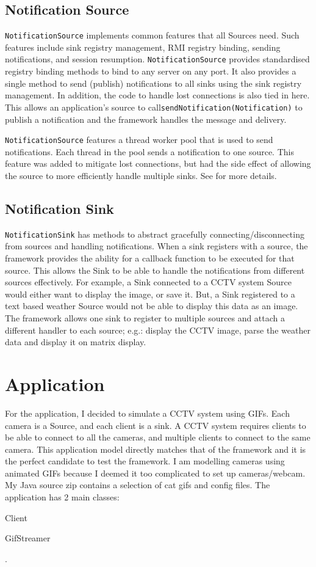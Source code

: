 \documentclass[a4paper]{article}
\begin{document}
\subsection{Notification Source}
\texttt{NotificationSource} implements common features that all Sources need.
Such features include sink registry management, RMI registry binding, sending notifications, and session resumption.
\texttt{NotificationSource} provides standardised registry binding methods to bind to any server on any port.
It also provides a single method to send (publish) notifications to all sinks using the sink registry management.
In addition, the code to handle lost connections is also tied in here.
This allows an application's source to call\texttt{sendNotification(Notification)} to publish a notification and the framework handles the message and delivery.

\texttt{NotificationSource} features a thread worker pool that is used to send notifications.
Each thread in the pool sends a notification to one source.
This feature was added to mitigate lost connections, but had the side effect of allowing the source to more efficiently handle multiple sinks.
See  for more details.

\subsection{Notification Sink}
\texttt{NotificationSink} has methods to abstract gracefully connecting/disconnecting from sources and handling notifications.
When a sink registers with a source, the framework provides the ability for a callback function to be executed for that source.
This allows the Sink to be able to handle the notifications from different sources effectively.
For example, a Sink connected to a CCTV system Source would either want to display the image, or save it.
But, a Sink registered to a text based weather Source would not be able to display this data as an image.
The framework allows one sink to register to multiple sources and attach a different handler to each source;
e.g.: display the CCTV image, parse the weather data and display it on matrix display.

\section{Application}
For the application, I decided to simulate a CCTV system using GIFs.
Each camera is a Source, and each client is a sink.
A CCTV system requires clients to be able to connect to all the cameras, and multiple clients to connect to the same camera.
This application model directly matches that of the framework and it is the perfect candidate to test the framework.
I am modelling cameras using animated GIFs because I deemed it too complicated to set up cameras/webcam.
My Java source zip contains a selection of cat gifs and config files. The application has 2 main classes:
\begin{enumerate*}
  \item Client
  \item GifStreamer
\end{enumerate*}.
\end{document}
